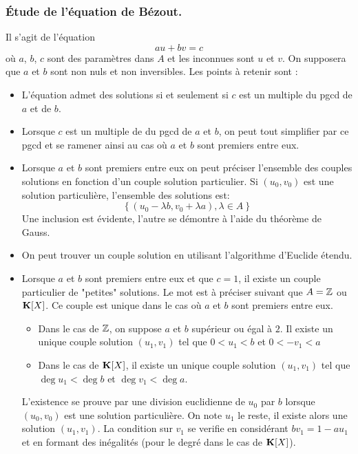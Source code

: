 \subsubsection{\'Etude de l'équation de Bézout.}
Il s'agit de l'équation
\begin{displaymath}
 au+bv=c
\end{displaymath}
où $a$, $b$, $c$ sont des paramètres dans $A$ et les inconnues sont $u$ et $v$. On supposera que $a$ et $b$ sont non nuls et non inversibles. Les points à retenir sont :
\begin{itemize}
 \item L'équation admet des solutions si et seulement si $c$ est un multiple du pgcd de $a$ et de $b$.
\item Lorsque $c$ est un multiple de du pgcd de $a$ et $b$, on peut tout simplifier par ce pgcd et se ramener ainsi au cas où $a$ et $b$ sont premiers entre eux.
\item Lorsque $a$ et $b$ sont premiers entre eux on peut préciser l'ensemble des couples solutions en fonction d'un couple solution particulier. Si $(u_0,v_0)$ est une solution particulière, l'ensemble des solutions est:
\begin{displaymath}
 \left\lbrace (u_0-\lambda b, v_0+\lambda a),\lambda \in A\right\rbrace 
\end{displaymath}
Une inclusion est évidente, l'autre se démontre à l'aide du théorème de Gauss.
\item On peut trouver un couple solution en utilisant l'algorithme d'Euclide étendu.
\item Lorsque $a$ et $b$ sont premiers entre eux et que $c=1$, il existe un couple particulier de "petites" solutions. Le mot est à préciser suivant que $A=\mathbb{Z}$ ou $\mathbf{K}[X]$. Ce couple est unique dans le cas où $a$ et $b$ sont premiers entre eux.\begin{itemize}
 \item Dans le cas de $\mathbb{Z}$, on suppose $a$ et $b$ supérieur ou égal à $2$. Il existe un unique couple solution $(u_1,v_1)$ tel que $0<u_1<b$ et $0<-v_1<a$
\item Dans le cas de $\mathbf{K}[X]$, il existe un unique couple solution $(u_1,v_1)$ tel que $\deg u_1 < \deg b$ et $\deg v_1<\deg a$.
\end{itemize}
L'existence se prouve par une division euclidienne de $u_0$ par $b$ lorsque $(u_0,v_0)$ est une solution particulière. On note $u_1$ le reste, il existe alors une solution $(u_1,v_1)$. La condition sur $v_1$ se verifie en considérant $bv_1 = 1- au_1$ et en formant des inégalités (pour le degré dans le cas de $\mathbf{K}[X]$).
\end{itemize}


